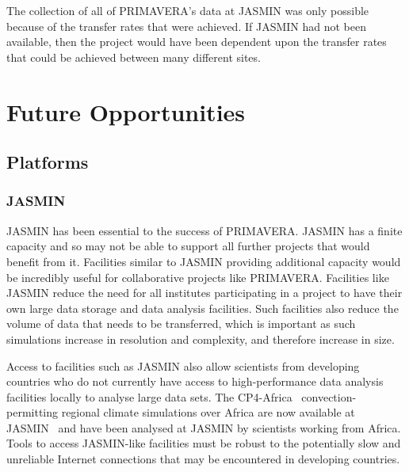 \documentclass[gmd, manuscript]{copernicus}
\begin{document}
The collection of all of PRIMAVERA's data at JASMIN was only possible because of the transfer rates that were achieved. If JASMIN had not been available, then the project would have been dependent upon the transfer rates that could be achieved between many different sites.


\section{Future Opportunities}

\subsection{Platforms}

\subsubsection{JASMIN}
JASMIN has been essential to the success of PRIMAVERA. JASMIN has a finite capacity and so may not be able to support all further projects that would benefit from it. Facilities similar to JASMIN providing additional capacity would be incredibly useful for collaborative projects like PRIMAVERA. Facilities like JASMIN reduce the need for all institutes participating in a project to have their own large data storage and data analysis facilities. Such facilities also reduce the volume of data that needs to be transferred, which is important as such simulations increase in resolution and complexity, and therefore increase in size.

Access to facilities such as JASMIN also allow scientists from developing countries who do not currently have access to high-performance data analysis facilities locally to analyse large data sets. The CP4-Africa~\citep{Stratton2018} convection-permitting regional climate simulations over Africa are now available at JASMIN~\citep{Senior2019} and have been analysed at JASMIN by scientists working from Africa. Tools to access JASMIN-like facilities must be robust to the potentially slow and unreliable Internet connections that may be encountered in developing countries.
\end{document}
